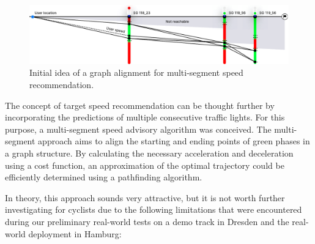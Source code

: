 \begin{figure}[htbp]
\centering
\includegraphics[width=\linewidth]{images/multi-segment-approach.pdf}
\caption{Initial idea of a graph alignment for multi-segment speed recommendation.}
\label{fig:multi-segment-approach}
\end{figure}

The concept of target speed recommendation can be thought further by incorporating the predictions of multiple consecutive traffic lights. For this purpose, a multi-segment speed advisory algorithm was conceived. The multi-segment approach aims to align the starting and ending points of green phases in a graph structure. By calculating the necessary acceleration and deceleration using a cost function, an approximation of the optimal trajectory could be efficiently determined using a pathfinding algorithm. 

In theory, this approach sounds very attractive, but it is not worth further investigating for cyclists due to the following limitations that were encountered during our preliminary real-world tests on a demo track in Dresden and the real-world deployment in Hamburg:

